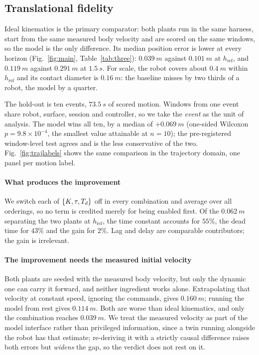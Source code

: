 \subsection{Translational fidelity}
\label{sec:results:rsim}

Ideal kinematics is the primary comparator: both plants run in the same
harness, start from the same measured body velocity and are scored on the same
windows, so the model is the only difference. Its median position error is
lower at every horizon (Fig.~\ref{fig:main}, Table~\ref{tab:three}):
$\SI{0.039}{m}$ against $\SI{0.101}{m}$ at $h_{\mathrm{ref}}$, and
$\SI{0.119}{m}$ against $\SI{0.291}{m}$ at $\SI{1.5}{s}$. For scale, the robot
covers about $\SI{0.4}{m}$ within $h_{\mathrm{ref}}$ and its contact diameter is
$\SI{0.16}{m}$: the baseline misses by two thirds of a robot, the model by a
quarter.

The hold-out is ten events, $\SI{73.5}{s}$ of scored motion. Windows from one
event share robot, surface, session and controller, so we take the \emph{event}
as the unit of analysis. The model wins all ten, by a median of
$+\SI{0.069}{m}$ (one-sided Wilcoxon $p = 9.8\times10^{-4}$, the smallest value
attainable at $n = 10$); the pre-registered window-level test agrees and is the
less conservative of the two. Fig.~\ref{fig:trajlabels} shows the same comparison in the trajectory domain, one panel per motion label.



\paragraph{What produces the improvement}
We switch each of $\{K,\tau,T_{d}\}$ off in every combination and average over all
orderings, so no term is credited merely for being enabled first. Of the
$\SI{0.062}{m}$ separating the two plants at $h_{\mathrm{ref}}$, the time
constant accounts for $55\%$, the dead time for $43\%$ and the gain for $2\%$.
Lag and delay are comparable contributors; the gain is irrelevant.

\paragraph{The improvement needs the measured initial velocity}
Both plants are seeded with the measured body velocity, but only the dynamic one
can carry it forward, and neither ingredient works alone. Extrapolating that
velocity at constant speed, ignoring the commands, gives $\SI{0.160}{m}$;
running the model from rest gives $\SI{0.114}{m}$. Both are worse than ideal
kinematics, and only the combination reaches $\SI{0.039}{m}$. We treat the
measured velocity as part of the model interface rather than privileged
information, since a twin running alongside the robot has that estimate;
re-deriving it with a strictly causal difference raises both errors but
\emph{widens} the gap, so the verdict does not rest on it.


